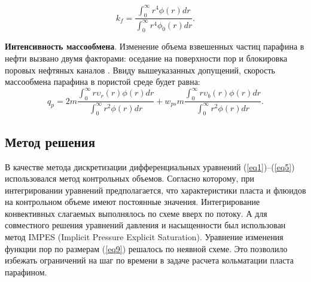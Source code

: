 \documentclass[a4paper,12pt]{article}
\begin{document}
\begin{equation}\label{eq11}
k_f = \frac
{ \int_{0}^{\infty} r^4 \phi (r) dr}
{ \int_{0}^{\infty} r^4 \phi_0 (r) dr}.
\end{equation}

\par \textbf{Интенсивность массообмена}. Изменение объема взвешенных частиц парафина в нефти вызвано двумя факторами: оседание на поверхности пор и блокировка поровых нефтяных каналов \cite{bib:03}. Ввиду вышеуказанных допущений, скорость массообмена парафина в пористой среде будет равна:
\begin{equation}\label{eq12}
q_p =
2 m \frac{ \int_{0}^{\infty} r \upsilon_r(r) \phi (r) dr}{ \int_{0}^{\infty} r^2 \phi(r) dr} + 
w_{ps} m  \frac{ \int_{0}^{\infty} r \upsilon_b(r) \phi (r) dr}{ \int_{0}^{\infty} r^2 \phi(r) dr}.
\end{equation}


\vspace{1em}
{\subsection*{\normalsize Метод решения}}
	В качестве метода дискретизации дифференциальных уравнений (\ref{eq1})--(\ref{eq5}) использовался метод контрольных объемов. Согласно которому, при интегрировании уравнений предполагается, что характеристики пласта и флюидов на контрольном объеме имеют постоянные значения. Интегрирование конвективных слагаемых выполнялось по схеме вверх по потоку. А для совместного решения уравнений давления и насыщенности был использован метод IMPES (Implicit Pressure Explicit Saturation). Уравнение изменения функции пор по размерам (\ref{eq9}) решалось по неявной схеме. Это позволило избежать ограничений на шаг по времени в задаче расчета кольматации пласта парафином.
\end{document}
